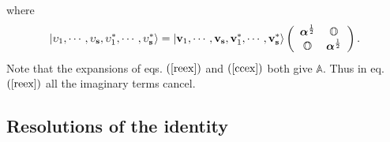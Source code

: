 \documentclass[aps,preprint]{revtex4}%
\begin{document}
where
\begin{equation}
\left\vert \mathbf{\upsilon}_{1},\cdots,\mathbf{\upsilon}_{\mathbf{s}%
},\mathbf{\upsilon}_{1}^{\ast},\cdots,\mathbf{\upsilon}_{\mathbf{s}}^{\ast
}\right\rangle =\left\vert \mathbf{v}_{1},\cdots,\mathbf{v}_{\mathbf{s}%
},\mathbf{v}_{1}^{\ast},\cdots,\mathbf{v}_{\mathbf{s}}^{\ast}\right\rangle
\left(
\begin{array}
[c]{cc}%
\boldsymbol{\alpha}^{\frac{1}{2}} & \mathbb{O}\\
\mathbb{O} & \boldsymbol{\alpha}^{\frac{1}{2}}%
\end{array}
\right)  .
\end{equation}
Note that the expansions of eqs. $\left(  \ref{reex}\right)  $ and $\left(
\ref{ccex}\right)  $ both give $\mathbb{A}.$ Thus in eq. $\left(
\ref{reex}\right)  $ all the imaginary terms cancel.

\subsection{Resolutions of the identity}
\end{document}

